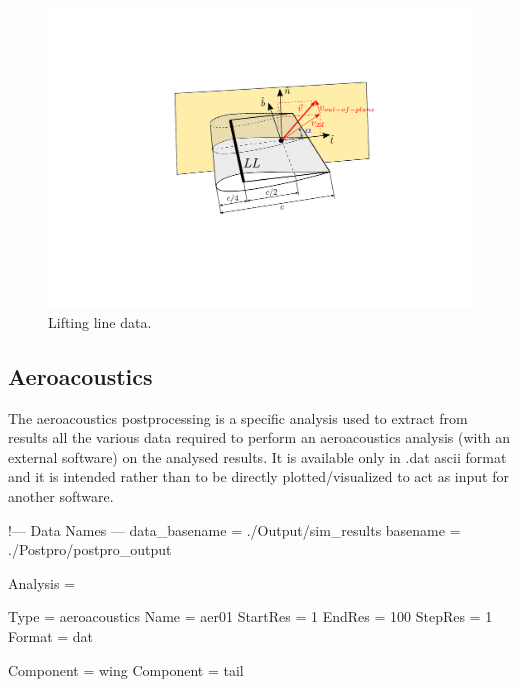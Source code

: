 \begin{figure}[h]
\centering
\includegraphics[width=1.0\textwidth, trim = 100 180 100 145, clip]{./images/ll_output_2} 
\caption{Lifting line data.}
\label{fig:ll_output}
\end{figure}



\subsection{Aeroacoustics}
The aeroacoustics postprocessing is a specific analysis used to extract from results all the various data required to perform an aeroacoustics analysis (with an external software) on the analysed results. It is available only in .dat ascii format  and it is intended rather than to be directly plotted/visualized to act as input for another software.

\begin{inputfile}[frame=single, caption={dust\_post.in for aeroacoustics}, label={file:dust_post.in_aeroacoustics}]
!--- Data Names ---
data_basename = ./Output/sim_results
basename =     ./Postpro/postpro_output

Analysis = {

Type = aeroacoustics
Name = aer01
StartRes = 1
EndRes   = 100 
StepRes  = 1
Format = dat

Component = wing
Component = tail

}
\end{inputfile}


